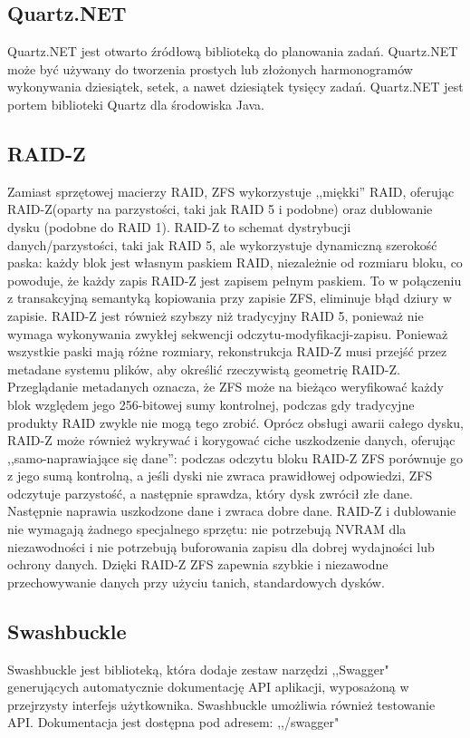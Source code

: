 \documentclass[12pt,a4paper]{article}
\begin{document}
		\subsection{Quartz.NET}
			\indent Quartz.NET jest otwarto źródłową biblioteką do planowania zadań.
			Quartz.NET może być używany do tworzenia prostych lub złożonych harmonogramów wykonywania
			dziesiątek, setek, a nawet dziesiątek tysięcy zadań.
			Quartz.NET jest portem biblioteki Quartz dla środowiska Java. 	 
		
		\subsection{RAID-Z}
			\indent Zamiast sprzętowej macierzy RAID, ZFS wykorzystuje ,,miękki'' RAID, oferując RAID-Z(oparty na parzystości, taki jak RAID 5 i podobne) oraz dublowanie dysku
			(podobne do RAID 1). RAID-Z to schemat dystrybucji danych/parzystości, taki jak RAID 5, ale wykorzystuje dynamiczną szerokość paska: każdy blok jest własnym paskiem
			RAID, niezależnie od rozmiaru
			bloku, co powoduje, że każdy zapis RAID-Z jest zapisem pełnym paskiem. To w połączeniu z transakcyjną semantyką kopiowania przy zapisie ZFS, eliminuje błąd dziury w zapisie.
			RAID-Z jest również szybszy niż tradycyjny RAID 5, ponieważ nie wymaga wykonywania zwykłej sekwencji odczytu-modyfikacji-zapisu. Ponieważ wszystkie paski mają różne rozmiary,
			rekonstrukcja RAID-Z musi przejść przez metadane systemu plików, aby określić rzeczywistą geometrię RAID-Z. Przeglądanie metadanych oznacza, że ZFS może na bieżąco
			weryfikować każdy blok względem jego 256-bitowej sumy kontrolnej, podczas gdy tradycyjne produkty RAID zwykle nie mogą tego zrobić. Oprócz obsługi awarii całego dysku,
			RAID-Z może również wykrywać i korygować ciche uszkodzenie danych, oferując ,,samo-naprawiające się dane'': podczas odczytu bloku RAID-Z ZFS porównuje go z jego sumą kontrolną,
			a jeśli dyski nie zwraca prawidłowej odpowiedzi, ZFS odczytuje parzystość, a następnie sprawdza, który dysk zwrócił złe dane. Następnie naprawia uszkodzone dane i zwraca
			dobre dane. RAID-Z i dublowanie nie wymagają żadnego specjalnego sprzętu: nie potrzebują NVRAM dla niezawodności i nie potrzebują buforowania zapisu dla dobrej wydajności
			lub ochrony danych. Dzięki RAID-Z ZFS zapewnia szybkie i niezawodne przechowywanie danych przy użyciu tanich, standardowych dysków.
						 
		\subsection{Swashbuckle}
			\indent Swashbuckle jest biblioteką, która dodaje zestaw narzędzi ,,Swagger" generujących automatycznie dokumentację API aplikacji,
				wyposażoną w przejrzysty interfejs użytkownika. Swashbuckle umożliwia również testowanie API. Dokumentacja jest dostępna pod adresem: ,,/swagger"
\end{document}
